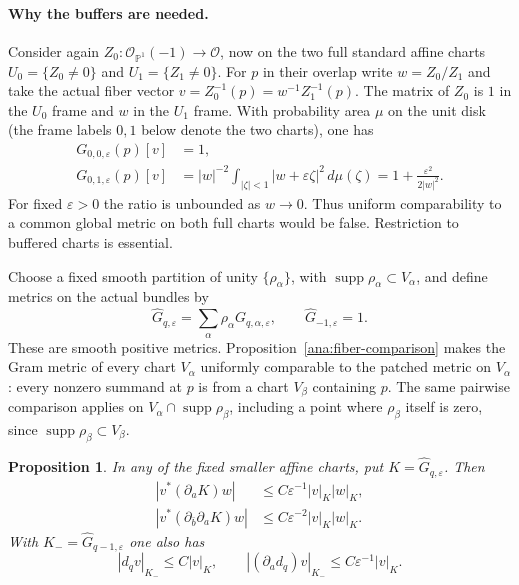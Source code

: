 \documentclass[11pt,reqno]{amsart}
\numberwithin{equation}{section}
\newtheorem{proposition}[theorem]{Proposition}
\theoremstyle{definition}
\theoremstyle{remark}
\newcommand{\Pj}{\mathbb P}
\newcommand{\cO}{\mathcal O}
\DeclareMathOperator{\supp}{supp}
\begin{document}
\paragraph{Why the buffers are needed.}
Consider again $Z_0:\cO_{\Pj^1}(-1)\to\cO$, now on the two full
standard affine charts $U_0=\{Z_0\ne0\}$ and $U_1=\{Z_1\ne0\}$.
For $p$ in their overlap write $w=Z_0/Z_1$ and take the actual
fiber vector $v=Z_0^{-1}(p)=w^{-1}Z_1^{-1}(p)$. The matrix of
$Z_0$ is $1$ in the $U_0$ frame and $w$ in the $U_1$ frame.
With probability area $\mu$ on the unit disk (the frame labels
$0,1$ below denote the two charts), one has
\[
 \begin{split}
 G_{0,0,\varepsilon}(p)[v]&=1,\\
 G_{0,1,\varepsilon}(p)[v]
 &=|w|^{-2}\int_{|\zeta|<1}|w+\varepsilon\zeta|^2\,d\mu(\zeta)
 =1+\frac{\varepsilon^2}{2|w|^2}.
 \end{split}
\]
For fixed $\varepsilon>0$ the ratio is unbounded as $w\to0$.
Thus uniform comparability to a common global metric on both full
charts would be false. Restriction to buffered charts is essential.

Choose a fixed smooth partition of unity $\{\rho_\alpha\}$,
with $\supp\rho_\alpha\subset V_\alpha$, and define metrics on the
actual bundles by
\begin{equation}\label{ana:patched-metric}
 \widehat G_{q,\varepsilon}
 =\sum_\alpha\rho_\alpha G_{q,\alpha,\varepsilon},
 \qquad \widehat G_{-1,\varepsilon}=1.
\end{equation}
These are smooth positive metrics.  Proposition~\ref{ana:fiber-comparison}
makes the Gram metric of every chart $V_\alpha$ uniformly comparable
to the patched metric on $V_\alpha$: every nonzero summand at $p$
is from a chart $V_\beta$ containing $p$. The same pairwise comparison
applies on $V_\alpha\cap\supp\rho_\beta$, including a point where
$\rho_\beta$ itself is zero, since $\supp\rho_\beta\subset V_\beta$.

\begin{proposition}\label{ana:patched-derivatives}
In any of the fixed smaller affine charts, put
$K=\widehat G_{q,\varepsilon}$.  Then
\begin{align*}
 |v^*(\partial_aK)w|&\leq C\varepsilon^{-1}|v|_K|w|_K,\\
 |v^*(\partial_{\bar b}\partial_aK)w|
 &\leq C\varepsilon^{-2}|v|_K|w|_K.
\end{align*}
With $K_- =\widehat G_{q-1,\varepsilon}$ one also has
\[
 |d_qv|_{K_-}\leq C|v|_K,
 \qquad
 |(\partial_a d_q)v|_{K_-}
 \leq C\varepsilon^{-1}|v|_K.
\]
\end{proposition}
\end{document}
